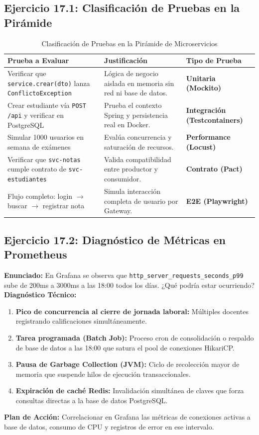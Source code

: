 \documentclass[11pt,a4paper]{article}
\begin{document}
\subsection{Ejercicio 17.1: Clasificación de Pruebas en la Pirámide}
\begin{table}[H]
    \centering
    \caption{Clasificación de Pruebas en la Pirámide de Microservicios}
    \label{tab:ejercicio1}
    \begin{tabular}{p{6.5cm} p{5cm} l}
        \toprule
        \textbf{Prueba a Evaluar} & \textbf{Justificación} & \textbf{Tipo de Prueba} \\
        \midrule
        Verificar que \texttt{service.crear(dto)} lanza \texttt{ConflictoException} & Lógica de negocio aislada en memoria sin red ni base de datos. & \textbf{Unitaria (Mockito)} \\[0.2cm]
        Crear estudiante vía \texttt{POST /api} y verificar en PostgreSQL & Prueba el contexto Spring y persistencia real en Docker. & \textbf{Integración (Testcontainers)} \\[0.2cm]
        Simular 1000 usuarios en semana de exámenes & Evalúa concurrencia y saturación de recursos. & \textbf{Performance (Locust)} \\[0.2cm]
        Verificar que \texttt{svc-notas} cumple contrato de \texttt{svc-estudiantes} & Valida compatibilidad entre productor y consumidor. & \textbf{Contrato (Pact)} \\[0.2cm]
        Flujo completo: login $\rightarrow$ buscar $\rightarrow$ registrar nota & Simula interacción completa de usuario por Gateway. & \textbf{E2E (Playwright)} \\
        \bottomrule
    \end{tabular}
\end{table}

\subsection{Ejercicio 17.2: Diagnóstico de Métricas en Prometheus}
\textbf{Enunciado:} En Grafana se observa que \texttt{http\_server\_requests\_seconds\_p99} sube de 200ms a 3000ms a las 18:00 todos los días. ¿Qué podría estar ocurriendo?\\
\textbf{Diagnóstico Técnico:}
\begin{enumerate}
    \item \textbf{Pico de concurrencia al cierre de jornada laboral:} Múltiples docentes registrando calificaciones simultáneamente.
    \item \textbf{Tarea programada (Batch Job):} Proceso cron de consolidación o respaldo de base de datos a las 18:00 que satura el pool de conexiones HikariCP.
    \item \textbf{Pausa de Garbage Collection (JVM):} Ciclo de recolección mayor de memoria que suspende hilos de ejecución transaccionales.
    \item \textbf{Expiración de caché Redis:} Invalidación simultánea de claves que forza consultas directas a la base de datos PostgreSQL.
\end{enumerate}
\textbf{Plan de Acción:} Correlacionar en Grafana las métricas de conexiones activas a base de datos, consumo de CPU y registros de error en ese intervalo.
\end{document}
